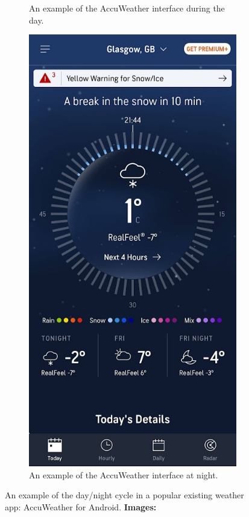 \documentclass{l4proj}
\begin{document}
\begin{figure}[htb!]
\begin{subfigure}[b]{0.4\textwidth}
        \caption{An example of the AccuWeather interface during the day.}
        \label{fig:syn1}
    \end{subfigure}
    \quad
    \begin{subfigure}[b]{0.4\textwidth}
        \includegraphics[width=\textwidth]{images/Accu_night.jpg}
        \caption{An example of the AccuWeather interface at night.}
        \label{fig:syn2}
    \end{subfigure}
    \caption{An example of the day/night cycle in a popular existing weather app: AccuWeather for Android. \textbf{Images: }\cite{accuweather}
    }\label{fig:accu_daynight}
\end{figure}
\end{document}
